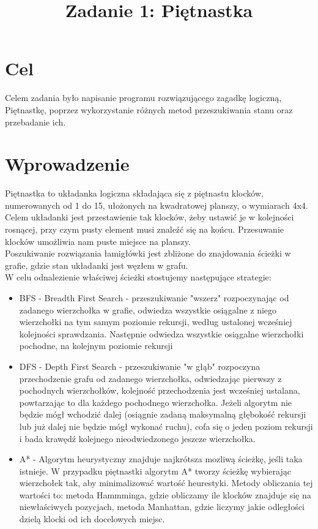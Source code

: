 \documentclass{classrep}
\author{
  \studentinfo{Maciej Pracucik}{216869} \and
  \studentinfo{Adam Jóźwiak}{216786}
}
\title{\textbf{Zadanie 1: Piętnastka}}
\begin{document}
\maketitle

\section{Cel}
{
Celem zadania było napisanie programu rozwiązującego zagadkę logiczną, 
Piętnastkę, poprzez wykorzystanie różnych metod przeszukiwania stanu oraz przebadanie ich.}

\section{Wprowadzenie}
{
Piętnastka to układanka logiczna składająca się z piętnastu klocków, numerowanych od 1 do 15, ułożonych na kwadratowej planszy,
o wymiarach 4x4. Celem układanki jest przestawienie tak klocków, żeby ustawić je w kolejności rosnącej, przy czym pusty element musi znaleźć się na końcu. Przesuwanie klocków umożliwia nam puste miejsce na planszy.\\
Poszukiwanie rozwiązania łamigłówki jest zbliżone do znajdowania ścieżki w grafie, gdzie stan układanki jest węzłem w grafu.\\ 
W celu odnalezienie właściwej ścieżki stostujemy następujące strategie:\\
\begin{itemize}
	\item BFS - Breadth First Search - przeszukiwanie "wszerz" rozpoczynając od zadanego wierzchołka w grafie, odwiedza wszystkie osiągalne z niego wierzchołki na tym samym poziomie rekursji, według ustalonej wcześniej kolejności sprawdzania. Następnie odwiedza wszystkie osiągalne wierzchołki pochodne, na kolejnym poziomie rekursji
	\item DFS - Depth First Search - przeszukiwanie "w głąb" rozpoczyna przechodzenie grafu od zadanego wierzchołka, odwiedzając pierwszy z pochodnych wierzchołków, kolejność przechodzenia jest wcześniej ustalana, powtarzając to dla każdego pochodnego wierzchołka. Jeżeli algorytm nie będzie mógł wchodzić dalej (osiągnie zadaną maksymalną głębokość rekursji lub już dalej nie będzie mógł wykonać ruchu), cofa się o jeden poziom rekursji i bada krawędź kolejnego nieodwiedzonego jeszcze wierzchołka.
	\item A* - Algorytm heurystyczny znajduje najkrótsza mozliwą ścieżkę, jeśli taka istnieje. W przypadku piętnastki algorytm A* tworzy ścieżkę wybierając wierzchołek tak, aby minimalizować wartość heurestyki. Metody obliczania tej wartości to: metoda Hammminga, gdzie obliczamy ile klocków znajduje się na niewłaściwych pozycjach, metoda Manhattan, gdzie liczymy jakie odległości dzielą klocki od ich docelowych miejsc.
\end{itemize}
}
\end{document}
